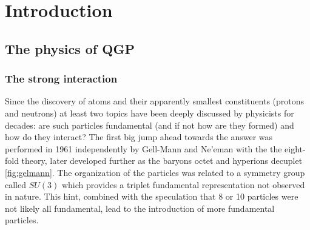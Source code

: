 
\chapter{Introduction}  %





\section{The physics of QGP} %
\subsection{The strong interaction}
Since the discovery of atoms and their apparently smallest constituents (protons and neutrons) at least two topics have been deeply discussed by physicists for decades: are such particles fundamental (and if not how are they formed) and how do they interact?
The first big jump ahead towards the answer was performed in 1961 independently by Gell-Mann and Ne'eman with the the eight-fold theory, later developed further as the baryons octet and hyperions decuplet \ref{fig:gelmann}.
The organization of the particles was related to a symmetry group called $SU(3)$ which provides a triplet fundamental representation not observed in nature.
This hint, combined with the speculation that 8 or 10 particles were not likely all fundamental, lead to the introduction of more fundamental particles.

